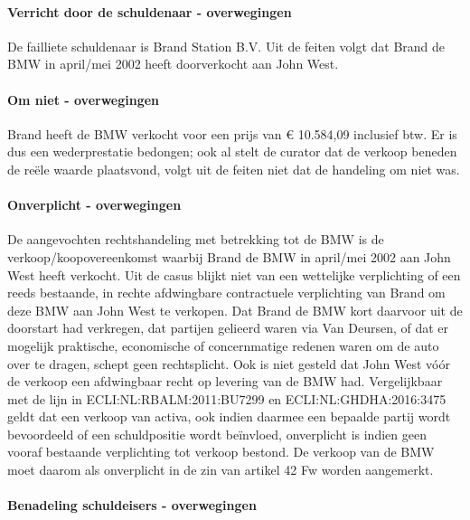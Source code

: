 \documentclass[
  dutch,
  a4paper,
]{article}
\begin{document}
\paragraph{Verricht door de schuldenaar - overwegingen}\label{verricht-door-de-schuldenaar---overwegingen-58}

De failliete schuldenaar is Brand Station B.V. Uit de feiten volgt dat Brand de BMW in april/mei 2002 heeft doorverkocht aan John West.

\paragraph{Om niet - overwegingen}\label{om-niet---overwegingen-58}

Brand heeft de BMW verkocht voor een prijs van € 10.584,09 inclusief btw. Er is dus een wederprestatie bedongen; ook al stelt de curator dat de verkoop beneden de reële waarde plaatsvond, volgt uit de feiten niet dat de handeling om niet was.

\paragraph{Onverplicht - overwegingen}\label{onverplicht---overwegingen-58}

De aangevochten rechtshandeling met betrekking tot de BMW is de verkoop/koopovereenkomst waarbij Brand de BMW in april/mei 2002 aan John West heeft verkocht. Uit de casus blijkt niet van een wettelijke verplichting of een reeds bestaande, in rechte afdwingbare contractuele verplichting van Brand om deze BMW aan John West te verkopen. Dat Brand de BMW kort daarvoor uit de doorstart had verkregen, dat partijen gelieerd waren via Van Deursen, of dat er mogelijk praktische, economische of concernmatige redenen waren om de auto over te dragen, schept geen rechtsplicht. Ook is niet gesteld dat John West vóór de verkoop een afdwingbaar recht op levering van de BMW had. Vergelijkbaar met de lijn in ECLI:NL:RBALM:2011:BU7299 en ECLI:NL:GHDHA:2016:3475 geldt dat een verkoop van activa, ook indien daarmee een bepaalde partij wordt bevoordeeld of een schuldpositie wordt beïnvloed, onverplicht is indien geen vooraf bestaande verplichting tot verkoop bestond. De verkoop van de BMW moet daarom als onverplicht in de zin van artikel 42 Fw worden aangemerkt.

\paragraph{Benadeling schuldeisers - overwegingen}\label{benadeling-schuldeisers---overwegingen-58}
\end{document}
